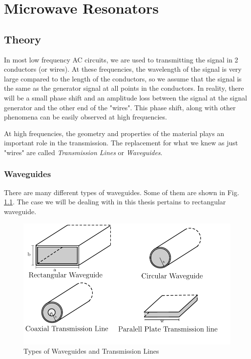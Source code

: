 
\chapter{Microwave Resonators} %

\label{Chapter4} %


\section{Theory}

In most low frequency AC circuits, we are used to transmitting the signal in 2 conductors (or wires). At these frequencies, the wavelength of the signal is very large compared to the length of the conductors, so we assume that the signal is the same as the generator signal at all points in the conductors. In reality, there will be a small phase shift and an amplitude loss between the signal at the signal generator and the other end of the "wires". This phase shift, along with other phenomena can be easily observed at high frequencies.

At high frequencies, the geometry and properties of the material plays an important role in the transmission. The replacement for what we knew as just "wires" are called \textit{Transmission Lines} or \textit{Waveguides}.

\subsection{Waveguides}

There are many different types of waveguides. Some of them are shown in Fig. \ref{fig:waveguides}. The case we will be dealing with in this thesis pertains to rectangular waveguide.

\begin{figure}
\centering
\includegraphics{Figures/Waveguides}
\decoRule
\caption[Waveguide Types]{Types of Waveguides and Transmission Lines}
\label{fig:waveguides}
\end{figure}

